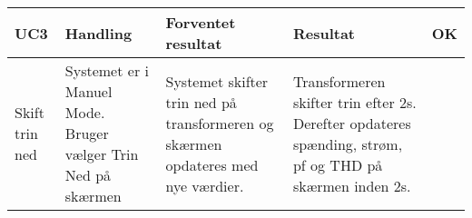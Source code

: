 \begin{table}[H]
	\centering
	\begin{tabular}{|p{2cm}|p{3cm}|p{4cm}|p{4.5cm}|p{1cm}|}
		\hline
		\textbf{UC3} & \textbf{Handling} & \textbf{Forventet resultat} & \textbf{Resultat} &\textbf{OK} \\\hline
		Skift trin ned & Systemet er i Manuel Mode. Bruger vælger Trin Ned på skærmen & Systemet skifter trin ned på transformeren og skærmen opdateres med nye værdier. & Transformeren skifter trin efter 2s. Derefter opdateres spænding, strøm, pf og THD på skærmen inden 2s.  & \checkmark \\\hline
		
		
	\end{tabular}
	
	
\end{table}